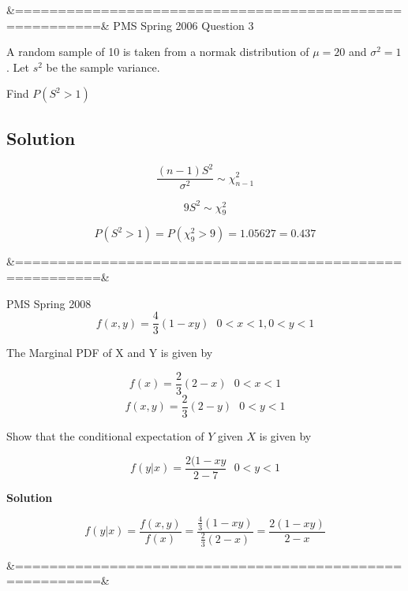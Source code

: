 &========================================================&
PMS Spring 2006 Question 3

A random sample of 10 is taken from a normak distribution of $\mu=20$ and $\sigma^2=1$. Let $s^2$ be the sample variance.

Find $P(S^2>1)$

\subsection*{Solution}

\[ \frac{(n-1)S^2}{\sigma^2} \sim \chi^2_{n-1}\]

\[ 9S^2 \sim \chi^2_{9}\]


\[ P(S^2>1) = P(\chi^2_{9}>9) = 1.05627 = 0.437\]

&========================================================&

PMS Spring 2008 
\[f(x,y) = \frac{4}{3}(1-xy) \mbox{   }0<x<1,0<y<1  \]

The Marginal PDF of X and Y is given by 

\[f(x) = \frac{2}{3}(2-x) \mbox{   }0<x<1 \]
\[f(x,y) = \frac{2}{3}(2-y) \mbox{   }0<y<1  \]

Show that the conditional expectation of $Y$ given $X$ is given by

\[ f(y|x) = \frac{2(1-xy}{2-7} \mbox{   }0<y<1\]

\textbf{Solution}

\[ f(y|x) = \frac{f(x,y)}{f(x)} = \frac{\frac{4}{3}(1-xy)}{\frac{2}{3}(2-x)} = \frac{2(1-xy)}{2-x}\]

&========================================================&
